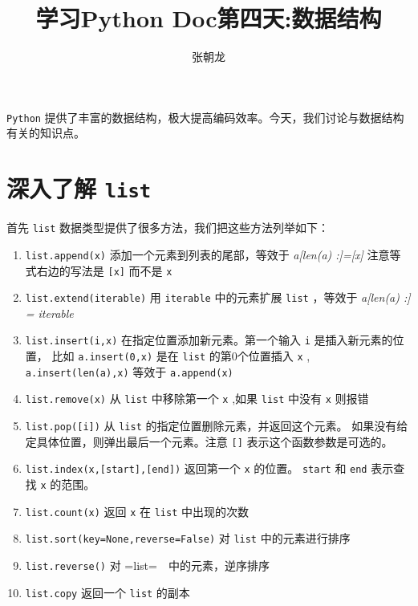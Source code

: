 \documentclass[10pt,a4paper,UTF8]{article}
\author{张朝龙}
\date{}
\title{学习Python Doc第四天:数据结构}
\begin{document}
\maketitle
\tableofcontents
{}
\newpage

\texttt{Python} 提供了丰富的数据结构，极大提高编码效率。今天，我们讨论与数据结构有关的知识点。

\section{深入了解 \texttt{list}}
\label{sec:org0fffd66}


首先 \texttt{list} 数据类型提供了很多方法，我们把这些方法列举如下：
\begin{instance}
\begin{enumerate}
\item \texttt{list.append(x)} 添加一个元素到列表的尾部，等效于 \emph{a[len(a) :]=[x]} 注意等式右边的写法是 \texttt{[x]} 而不是 \texttt{x}
\item \texttt{list.extend(iterable)}  用 \texttt{iterable} 中的元素扩展 \texttt{list} ，等效于 \emph{a[len(a) :] = iterable}
\item \texttt{list.insert(i,x)}  在指定位置添加新元素。第一个输入 \texttt{i} 是插入新元素的位置， 比如 \texttt{a.insert(0,x)} 是在 \texttt{list} 的第0个位置插入 \texttt{x} , \texttt{a.insert(len(a),x)} 等效于 \texttt{a.append(x)}
\item \texttt{list.remove(x)}  从 \texttt{list} 中移除第一个 \texttt{x} ,如果 \texttt{list} 中没有 \texttt{x} 则报错
\item \texttt{list.pop([i])} 从 \texttt{list} 的指定位置删除元素，并返回这个元素。 如果没有给定具体位置，则弹出最后一个元素。注意 \texttt{[]} 表示这个函数参数是可选的。
\item \texttt{list.index(x,[start],[end])} 返回第一个 \texttt{x} 的位置。 \texttt{start} 和 \texttt{end} 表示查找 \texttt{x} 的范围。
\item \texttt{list.count(x)} 返回 \texttt{x} 在 \texttt{list} 中出现的次数
\item \texttt{list.sort(key=None,reverse=False)} 对 \texttt{list} 中的元素进行排序
\item \texttt{list.reverse()}  对  =list=　中的元素，逆序排序
\item \texttt{list.copy} 返回一个 \texttt{list} 的副本
\end{enumerate}
\end{instance}
\end{document}
